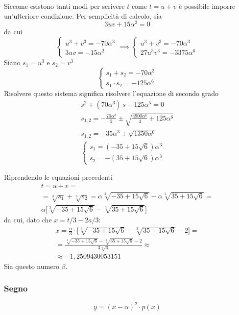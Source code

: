 \documentclass[a4paper, oneside, titlepage, reqno]{book}
\begin{document}
Siccome esistono tanti modi per scrivere $t$ come $t=u+v$ è possibile imporre un'ulteriore condizione. Per semplicità di calcolo, sia
\[
3uv+15\alpha^2=0
\]
da cui
\[
\begin{cases}
u^3+v^3=-70\alpha^3\\
3uv=-15\alpha^2
\end{cases}
\implies\begin{cases}
u^3+v^3=-70\alpha^3\\
27u^3v^3=-3375\alpha^6
\end{cases}
\]
Siano $s_1=u^3$ e $s_2=v^3$
\[
\begin{cases}
s_1+s_2=-70\alpha^3\\
s_1\cdot s_2=-125\alpha^6
\end{cases}
\]
Risolvere questo sistema significa risolvere l'equazione di secondo grado
\begin{gather*}
s^2+(70\alpha^3)\,s-125\alpha^5=0\\
s_{1,2}=-\frac{70\alpha^3}{2}\pm\sqrt{\frac{4900\alpha^6}{4}+125\alpha^6}\\
s_{1,2}=-35\alpha^3\pm\sqrt{1350\alpha^6}\\
\begin{cases}
s_1=(-35+15\sqrt{6})\alpha^3\\
s_2=-(35+15\sqrt{6})\alpha^3
\end{cases}
\end{gather*}

Riprendendo le equazioni precedenti
\begin{multline*}
t=u+v=\\
=\sqrt[3]{s_1}+\sqrt[3]{s_2}=\alpha\sqrt[3]{-35+15\sqrt{6}}-\alpha\sqrt[3]{35+15\sqrt{6}}=\\
\alpha\Bigg[\sqrt[3]{-35+15\sqrt{6}}-\sqrt[3]{35+15\sqrt{6}}\Bigg]
\end{multline*}
da cui, dato che $x=t/3-2a/3$:
\begin{multline*}
x=\frac{\alpha}{3}\cdot\Bigg[\sqrt[3]{-35+15\sqrt{6}}-\sqrt[3]{35+15\sqrt{6}}-2\Bigg]=\\
=\frac{\sqrt[3]{-35+15\sqrt{6}}-\sqrt[3]{35+15\sqrt{6}}-2}{3\sqrt[5]{4}}\approx\\
\approx -1,2509430053151
\end{multline*}
Sia questo numero $\beta$.

\subsubsection*{Segno}
\[
y=(x-\alpha)^2\cdot p(x)
\]
\end{document}
